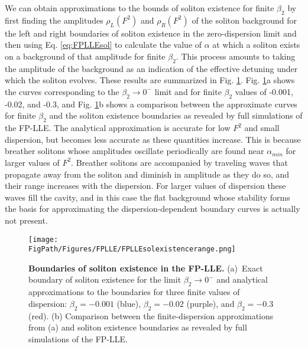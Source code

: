 We can obtain approximations to the bounds of soliton existence for finite $\beta_2$ by first finding the amplitudes $\rho_{L}(F^2)$ and $\rho_{R}(F^2)$ of the soliton background for the left and right boundaries of soliton existence in the zero-dispersion limit and then using Eq. \ref{eq:FPLLEsol} to calculate the value of $\alpha$ at which a soliton exists on a background of that amplitude for finite $\beta_2$. This process amounts to taking the amplitude of the background as an indication of the effective detuning under which the soliton evolves. These results are summarized in Fig. \ref{fig:FPLLEsolrange}. Fig. \ref{fig:FPLLEsolrange}a shows the curves corresponding to the $\beta_2\rightarrow0^-$ limit and for finite $\beta_2$ values of -0.001, -0.02, and -0.3, and Fig. \ref{fig:FPLLEsolrange}b shows a comparison between the approximate curves for finite $\beta_2$ and the soliton existence boundaries as revealed by full simulations of the FP-LLE. The analytical approximation is accurate for low $F^2$ and small dispersion, but becomes less accurate as these quantities increase. This is because breather solitons whose amplitudes oscillate periodically are found near $\alpha_{min}$ for larger values of $F^2$. Breather solitons are accompanied by traveling waves that propagate away from the soliton and diminish in amplitude as they do so, and their range increases with the dispersion. For larger values of dispersion these waves fill the cavity, and in this case the flat background whose stability forms the basis for approximating the dispersion-dependent boundary curves is actually not present. 

\begin{figure}[htpb]
	\begin{center}
		\texttt{[image: \\FigPath/Figures/FPLLE/FPLLEsolexistencerange.png]}
	\end{center}
	\caption[Boundaries of soliton existence in the FP-LLE]{\textbf{Boundaries of soliton existence in the FP-LLE.} (a)~Exact boundary of soliton existence for the limit $\beta_2\rightarrow0^-$ and analytical approximations to the boundaries for three finite values of dispersion: $\beta_2=-0.001$ (blue), $\beta_2=-0.02$ (purple), and $\beta_2=-0.3$ (red). (b) Comparison between the finite-dispersion approximations from (a) and soliton existence boundaries as revealed by full simulations of the FP-LLE.  }
	\label{fig:FPLLEsolrange}
\end{figure} 

